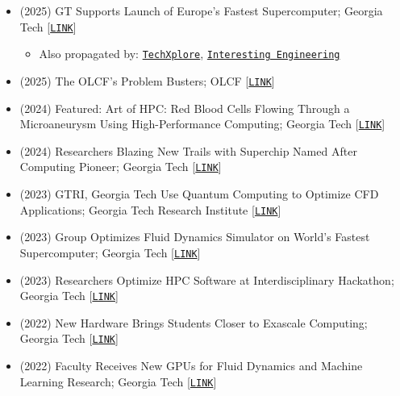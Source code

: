 \begin{itemize}
    \item (2025) GT Supports Launch of Europe's Fastest Supercomputer; Georgia Tech [\href{https://www.cc.gatech.edu/news/pancaked-water-droplets-help-launch-europes-fastest-supercomputer}{\tt LINK}]
    \begin{itemize}
        \item Also propagated by: \href{https://techxplore.com/news/2025-07-pancaked-droplets-europe-fastest-supercomputer.html}{\tt TechXplore}, \href{https://interestingengineering.com/innovation/europes-newly-launched-and-fastest-supercomputer}{\tt Interesting Engineering}
    \end{itemize}

    \item (2025) The OLCF's Problem Busters; OLCF [\href{https://www.olcf.ornl.gov/2025/02/11/the-olcfs-problem-busters/}{\tt LINK}]

    \item (2024) Featured: Art of HPC: Red Blood Cells Flowing Through a Microaneurysm Using High-Performance Computing; Georgia Tech [\href{https://sites.gatech.edu/research/sc-2024://sites.gatech.edu/research/sc-2024/}{\tt LINK}]

    \item (2024) Researchers Blazing New Trails with Superchip Named After Computing Pioneer; Georgia Tech [\href{https://www.cc.gatech.edu/news/researchers-blazing-new-trails-superchip-named-after-computing-pioneer}{\tt LINK}] 

    \item (2023) GTRI, Georgia Tech Use Quantum Computing to Optimize CFD Applications; Georgia Tech Research Institute
 [\href{https://gtri.gatech.edu/newsroom/gtri-georgia-tech-use-quantum-computing-optimize-cfd-applications}{\tt LINK}]

    \item (2023) Group Optimizes Fluid Dynamics Simulator on World's Fastest Supercomputer; Georgia Tech [\href{https://www.cc.gatech.edu/news/group-optimizes-fluid-dynamics-simulator-worlds-fastest-supercomputer}{\tt LINK}]

    \item (2023) Researchers Optimize HPC Software at Interdisciplinary Hackathon; Georgia Tech
[\href{https://www.cc.gatech.edu/news/researchers-optimize-hpc-software-interdisciplinary-hackathon}{\tt LINK}]

    \item (2022) New Hardware Brings Students Closer to Exascale Computing; Georgia Tech [\href{https://www.cc.gatech.edu/news/new-hardware-brings-students-closer-exascale-computing}{\tt LINK}]

    \item (2022) Faculty Receives New GPUs for Fluid Dynamics and Machine Learning Research; Georgia Tech [\href{https://www.cc.gatech.edu/news/faculty-receives-new-gpus-fluid-dynamics-and-machine-learning-research}{\tt LINK}]
\end{itemize}

